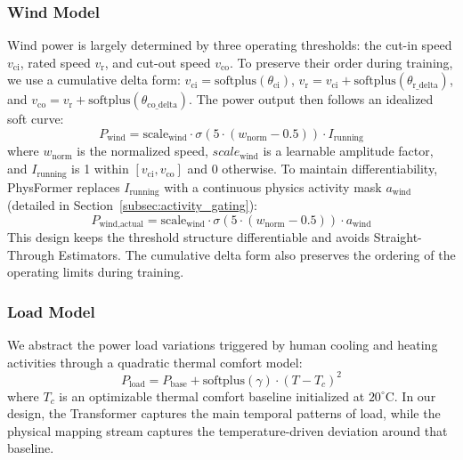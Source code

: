 \subsubsection{Wind Model}
Wind power is largely determined by three operating thresholds: the cut-in speed $v_{\text{ci}}$, rated speed $v_{\text{r}}$, and cut-out speed $v_{\text{co}}$. To preserve their order during training, we use a cumulative delta form: $v_{\text{ci}} = \text{softplus}(\theta_{\text{ci}})$, $v_{\text{r}} = v_{\text{ci}} + \text{softplus}(\theta_{\text{r\_delta}})$, and $v_{\text{co}} = v_{\text{r}} + \text{softplus}(\theta_{\text{co\_delta}})$. The power output then follows an idealized soft curve:
\begin{equation}
    P_{\text{wind}} = \text{scale}_{\text{wind}} \cdot \sigma(5 \cdot (w_{\text{norm}} - 0.5)) \cdot I_{\text{running}}
\label{eq:wind_ideal}
\end{equation}
where $w_{\text{norm}}$ is the normalized speed, $scale_{\text{wind}}$ is a learnable amplitude factor, and $I_{\text{running}}$ is 1 within $[v_{\text{ci}}, v_{\text{co}}]$ and 0 otherwise. To maintain differentiability, PhysFormer replaces $I_{\text{running}}$ with a continuous physics activity mask $a_{\text{wind}}$ (detailed in Section~\ref{subsec:activity_gating}):
\begin{equation}
    P_{\text{wind,actual}} = \text{scale}_{\text{wind}} \cdot \sigma(5 \cdot (w_{\text{norm}} - 0.5)) \cdot a_{\text{wind}}
\label{eq:wind_actual}
\end{equation}
This design keeps the threshold structure differentiable and avoids Straight-Through Estimators. The cumulative delta form also preserves the ordering of the operating limits during training.

\subsubsection{Load Model}
We abstract the power load variations triggered by human cooling and heating activities through a quadratic thermal comfort model:
\begin{equation}
    P_{\text{load}} = P_{\text{base}} + \text{softplus}(\gamma) \cdot (T - T_c)^2
\label{eq:load_model}
\end{equation}
where $T_c$ is an optimizable thermal comfort baseline initialized at $20^\circ\text{C}$. In our design, the Transformer captures the main temporal patterns of load, while the physical mapping stream captures the temperature-driven deviation around that baseline.

